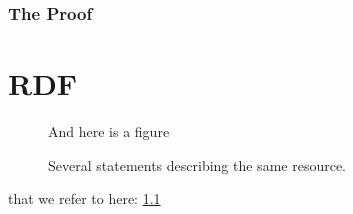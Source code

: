 \documentclass[a4paper,11pt]{kth-mag}
\begin{document}
\subsection{The Proof}
\appendix
\addappheadtotoc
\chapter{RDF}\label{appA}

\begin{figure}[ht]
   \begin{center}
And here is a figure
      \caption{
         \small{
            Several statements describing the same resource.
         }
      }
      \label{RDF_4}
   \end{center}
\end{figure}

that we refer to here: \ref{RDF_4}
\end{document}
